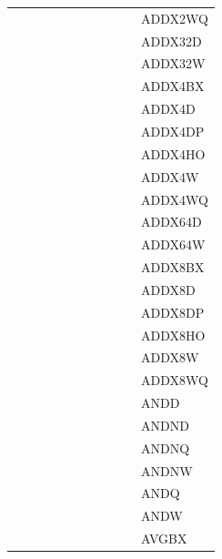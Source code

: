 {\begin{tabular}{|l|l|l|l|l|l|l|l|l|l|l|}
 & & & & & & & & & & \textsf{ADDX2WQ} \\
 & & & & & & & & & & \textsf{ADDX32D} \\
 & & & & & & & & & & \textsf{ADDX32W} \\
 & & & & & & & & & & \textsf{ADDX4BX} \\
 & & & & & & & & & & \textsf{ADDX4D} \\
 & & & & & & & & & & \textsf{ADDX4DP} \\
 & & & & & & & & & & \textsf{ADDX4HO} \\
 & & & & & & & & & & \textsf{ADDX4W} \\
 & & & & & & & & & & \textsf{ADDX4WQ} \\
 & & & & & & & & & & \textsf{ADDX64D} \\
 & & & & & & & & & & \textsf{ADDX64W} \\
 & & & & & & & & & & \textsf{ADDX8BX} \\
 & & & & & & & & & & \textsf{ADDX8D} \\
 & & & & & & & & & & \textsf{ADDX8DP} \\
 & & & & & & & & & & \textsf{ADDX8HO} \\
 & & & & & & & & & & \textsf{ADDX8W} \\
 & & & & & & & & & & \textsf{ADDX8WQ} \\
 & & & & & & & & & & \textsf{ANDD} \\
 & & & & & & & & & & \textsf{ANDND} \\
 & & & & & & & & & & \textsf{ANDNQ} \\
 & & & & & & & & & & \textsf{ANDNW} \\
 & & & & & & & & & & \textsf{ANDQ} \\
 & & & & & & & & & & \textsf{ANDW} \\
 & & & & & & & & & & \textsf{AVGBX} \\
\hline\end{tabular}
}
\smallskip

